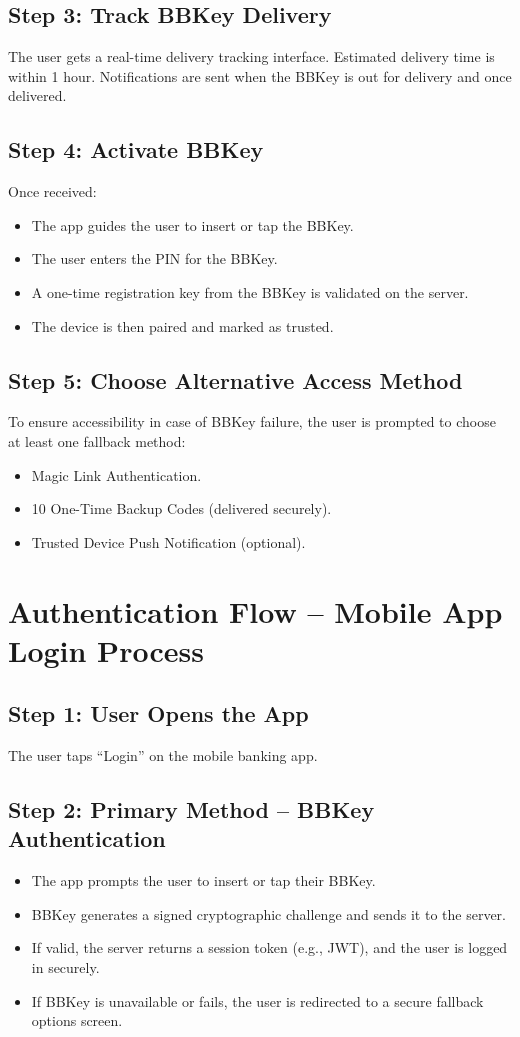 \documentclass{article}[12pt]
\begin{document}
\subsection*{Step 3: Track BBKey Delivery}
The user gets a real-time delivery tracking interface. Estimated delivery time is within 1 hour. Notifications are sent when the BBKey is out for delivery and once delivered.

\subsection*{Step 4: Activate BBKey}
Once received:
\begin{itemize}
    \item The app guides the user to insert or tap the BBKey.
    \item The user enters the PIN for the BBKey.
    \item A one-time registration key from the BBKey is validated on the server.
    \item The device is then paired and marked as trusted.
\end{itemize}

\subsection*{Step 5: Choose Alternative Access Method}
To ensure accessibility in case of BBKey failure, the user is prompted to choose at least one fallback method:
\begin{itemize}
    \item Magic Link Authentication.
    \item 10 One-Time Backup Codes (delivered securely).
    \item Trusted Device Push Notification (optional).
\end{itemize}

\section*{Authentication Flow – Mobile App Login Process}

\subsection*{Step 1: User Opens the App}
The user taps “Login” on the mobile banking app.

\subsection*{Step 2: Primary Method – BBKey Authentication}
\begin{itemize}
    \item The app prompts the user to insert or tap their BBKey.
    \item BBKey generates a signed cryptographic challenge and sends it to the server.
    \item If valid, the server returns a session token (e.g., JWT), and the user is logged in securely.
    \item If BBKey is unavailable or fails, the user is redirected to a secure fallback options screen.
\end{itemize}
\end{document}
